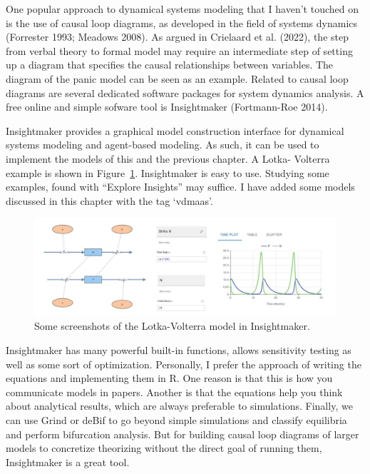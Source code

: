 \documentclass[
  a4paper,
  DIV=11,
  numbers=noendperiod]{scrreprt}
\begin{document}
One popular approach to dynamical systems modeling that I haven't
touched on is the use of causal loop diagrams, as developed in the field
of systems dynamics (Forrester 1993; Meadows 2008). As argued in
Crielaard et al. (2022), the step from verbal theory to formal model may
require an intermediate step of setting up a diagram that specifies the
causal relationships between variables. The diagram of the panic model
can be seen as an example. Related to causal loop diagrams are several
dedicated software packages for system dynamics analysis. A free online
and simple sofware tool is Insightmaker (Fortmann-Roe 2014).

Insightmaker provides a graphical model construction interface for
dynamical systems modeling and agent-based modeling. As such, it can be
used to implement the models of this and the previous chapter. A Lotka-
Volterra example is shown in Figure~\ref{fig-ch4n-img21-old-69}.
Insightmaker is easy to use. Studying some examples, found with
``Explore Insights'' may suffice. I have added some models discussed in
this chapter with the tag `vdmaas'.

\begin{figure}

{\centering \includegraphics{media/ch4n/image21.jpg}

}

\caption{\label{fig-ch4n-img21-old-69}Some screenshots of the
Lotka-Volterra model in Insightmaker.}

\end{figure}

Insightmaker has many powerful built-in functions, allows sensitivity
testing as well as some sort of optimization. Personally, I prefer the
approach of writing the equations and implementing them in R. One reason
is that this is how you communicate models in papers. Another is that
the equations help you think about analytical results, which are always
preferable to simulations. Finally, we can use Grind or deBif to go
beyond simple simulations and classify equilibria and perform
bifurcation analysis. But for building causal loop diagrams of larger
models to concretize theorizing without the direct goal of running them,
Insightmaker is a great tool.
\end{document}
